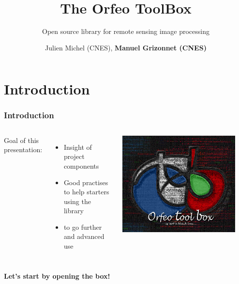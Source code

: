 \documentclass[8pt]{beamer}
\title{The Orfeo ToolBox}
\subtitle{Open source library for remote sensing image processing}
\author{Julien Michel (CNES), \textbf{Manuel Grizonnet (CNES)}}%
\date{}
\begin{document}
\begin{frame}
\titlepage
\end{frame}

\section{Introduction}

\begin{frame}
\frametitle{Introduction}
\begin{columns}
Goal of this presentation:
\begin{itemize}
\item Insight of project components 
\item Good practises to help starters using the library
\item to go further and advanced use
\end{itemize}
\includegraphics[width=0.9\textwidth]{images/LOGOTB_blackbox.png}
\end{columns}
\begin{center}
{\huge \color{red}{Orfeo ToolBox is not a black box \ldots}}

\textbf{Let's start by opening the box!}
\end{center}

\end{frame}
\end{document}
